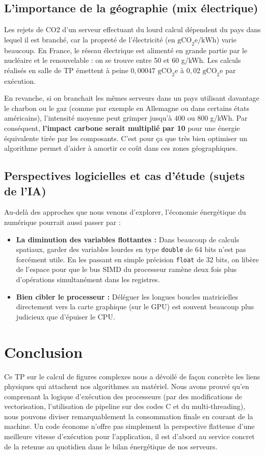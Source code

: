 \documentclass[11pt,a4paper]{article}
\begin{document}
\subsection{L'importance de la géographie (mix électrique)}

Les rejets de CO2 d'un serveur effectuant du lourd calcul dépendent du pays dans lequel il est branché, car la propreté de l'électricité (en $ \text{gCO}_2\text{e} / \text{kWh} $) varie beaucoup. En France, le réseau électrique est alimenté en grande partie par le nucléaire et le renouvelable : on se trouve entre 50 et 60 g/kWh. Les calculs réalisés en salle de TP émettent à peine $0,00047$ $\text{gCO}_2\text{e}$ à $0,02$ $\text{gCO}_2\text{e}$ par exécution.

En revanche, si on branchait les mêmes serveurs dans un pays utilisant davantage le charbon ou le gaz (comme par exemple en Allemagne ou dans certains états américains), l'intensité moyenne peut grimper jusqu'à $400$ ou $800$ g/kWh. Par conséquent, \textbf{l'impact carbone serait multiplié par 10} pour une énergie équivalente tirée par les composants. C'est pour ça que très bien optimiser un algorithme permet d'aider à amortir ce coût dans ces zones géographiques.

\subsection{Perspectives logicielles et cas d'étude (sujets de l'IA)}

Au-delà des approches que nous venons d'explorer, l'économie énergétique du numérique pourrait aussi passer par :
\begin{itemize}
    \item \textbf{La diminution des variables flottantes : } Dans beaucoup de calculs spatiaux, garder des variables lourdes en type \texttt{double} de 64 bits n'est pas forcément utile. En les passant en simple précision \texttt{float} de 32 bits, on libère de l'espace pour que le bus SIMD du processeur ramène deux fois plus d'opérations simultanément dans les registres.
    \item \textbf{Bien cibler le processeur : } Déléguer les longues boucles matricielles directement vers la carte graphique (sur le GPU) est souvent beaucoup plus judicieux que d'épuiser le CPU.
\end{itemize}

\section*{Conclusion}

Ce TP sur le calcul de figures complexes nous a dévoilé de façon concrète les liens physiques qui attachent nos algorithmes au matériel. Nous avons prouvé qu'en comprenant la logique d'exécution des processeurs (par des modifications de vectorisation, l'utilisation de pipeline sur des codes C et du multi-threading), nous pouvons diviser remarquablement la consommation finale en courant de la machine. Un code économe n'offre pas simplement la perspective flatteuse d'une meilleure vitesse d'exécution pour l'application, il est d'abord au service concret de la retenue au quotidien dans le bilan énergétique de nos serveurs.
\end{document}
